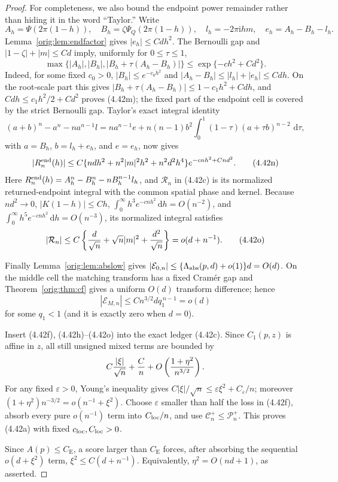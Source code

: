 \documentclass[11pt,a4paper]{article}
\numberwithin{equation}{section}
\theoremstyle{definition}
\theoremstyle{remark}
\newcommand{\ii}{\mathrm i}
\newcommand{\dd}{\,\mathrm d}
\newcommand{\CE}{C_{\mathrm E}}
\begin{document}
\begin{proof}
For completeness, we also bound the endpoint power remainder rather than
hiding it in the word ``Taylor.''  Write
\[
 A_h=\Psi(2\pi(1-h)),\quad
 B_h=\zeta\Psi_Q(2\pi(1-h)),\quad
 l_h=-2\pi\ii hm,\quad e_h=A_h-B_h-l_h.
\]
Lemma~\ref{orig:lem:endfactor} gives $|e_h|\le Cdh^2$.  The Bernoulli gap and
$|1-\zeta|+|m|\le Cd$ imply, uniformly for $0\le\tau\le1$,
\[
 \max\{|A_h|,|B_h|,|B_h+\tau(A_h-B_h)|\}
        \le \exp\{-c h^2+C d^2\}.                       \tag{4.42m}
\]
Indeed, for some fixed $c_0>0$, $|B_h|\le e^{-c_0h^2}$ and
$|A_h-B_h|\le |l_h|+|e_h|\le Cdh$.  On the root-scale part this gives
$|B_h+\tau(A_h-B_h)|\le1-c_1h^2+Cdh$, and
$Cdh\le c_1h^2/2+Cd^2$ proves (4.42m); the fixed part of the endpoint cell
is covered by the strict Bernoulli gap.
Taylor's exact integral identity
\[
 (a+b)^n-a^n-na^{n-1}l
 =na^{n-1}e+n(n-1)b^2
       \int_0^1(1-\tau)(a+\tau b)^{n-2}\,\dd\tau,
\]
with $a=B_h$, $b=l_h+e_h$, and $e=e_h$, now gives
\[
 |R_n^{\rm end}(h)|
 \le C\{ndh^2+n^2|m|^2h^2+n^2d^2h^4\}
              e^{-cnh^2+Cnd^2}.                       \tag{4.42n}
\]
Here $R_n^{\rm end}(h)=A_h^n-B_h^n-nB_h^{n-1}l_h$, and
$\mathcal R_n$ in (4.42c) is its normalized returned-endpoint integral
with the common spatial phase and kernel.
Because $nd^2\to0$, $|K(1-h)|\le Ch$,
$\int_0^\infty h^3e^{-cnh^2}\dd h=O(n^{-2})$, and
$\int_0^\infty h^5e^{-cnh^2}\dd h=O(n^{-3})$, its normalized integral
satisfies
\[
 |\mathcal R_n|
 \le C\left\{{d\over\sqrt n}+\sqrt n|m|^2
                         +{d^2\over\sqrt n}\right\}
 =o(d+n^{-1}).                                         \tag{4.42o}
\]

Finally Lemma~\ref{orig:lem:abslow} gives
$|\mathcal E_{0,n}|\le\{\Lambda_{\rm abs}(p,d)+o(1)\}d=O(d)$.
On the middle cell the matching transform has a fixed Cram\'er gap and
Theorem~\ref{orig:thm:cf} gives a uniform $O(d)$ transform difference; hence
\[
 |\mathcal E_{M,n}|\le Cn^{3/2}d q_1^{\,n-1}=o(d)
\]
for some $q_1<1$ (and it is exactly zero when $d=0$).

Insert (4.42f), (4.42h)--(4.42o) into the exact ledger (4.42c).
Since $C_1(p,z)$ is affine in $z$, all still unsigned mixed terms are
bounded by
\[
 C{|\xi|\over\sqrt n}+{C\over n}
       +O\left({1+\eta^2\over n^{3/2}}\right).
\]
For any fixed $\varepsilon>0$, Young's inequality gives
$C|\xi|/\sqrt n\le\varepsilon\xi^2+C_\varepsilon/n$; moreover
$(1+\eta^2)n^{-3/2}=o(n^{-1}+\xi^2)$.  Choose $\varepsilon$ smaller
than half the loss in (4.42f), absorb every pure $o(n^{-1})$ term into
$C_{\rm loc}/n$, and use
$\mathcal C_n^+\le\mathcal P_n^+$.  This proves (4.42a) with fixed
$c_{\rm loc},C_{\rm loc}>0$.

Since $A(p)\le\CE$, a score larger than $\CE$ forces, after absorbing
the sequential $o(d+\xi^2)$ term,
$\xi^2\le C(d+n^{-1})$.  Equivalently,
$\eta^2=O(nd+1)$, as asserted.
\end{proof}
\end{document}
